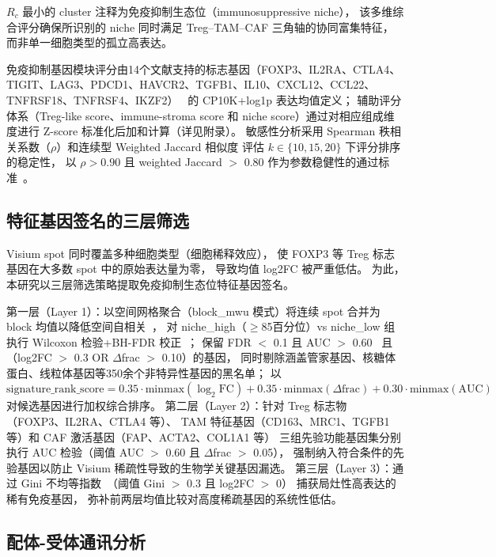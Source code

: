 \documentclass[12pt, a4paper]{ctexart}
\begin{document}
$R_c$ 最小的 cluster 注释为免疫抑制生态位（immunosuppressive niche），
该多维综合评分确保所识别的 niche 同时满足 Treg--TAM--CAF 三角轴的协同富集特征，
而非单一细胞类型的孤立高表达。

免疫抑制基因模块评分由14个文献支持的标志基因（FOXP3、IL2RA、CTLA4、TIGIT、LAG3、PDCD1、HAVCR2、TGFB1、IL10、CXCL12、CCL22、TNFRSF18、TNFRSF4、IKZF2）~\citep{sakaguchi2020regulatory,sharma2023immunosuppressive}
的 CP10K+log1p 表达均值定义；
辅助评分体系（Treg-like score、immune-stroma score 和 niche score）通过对相应组成维度进行 Z-score 标准化后加和计算（详见附录）。
敏感性分析采用 Spearman 秩相关系数（$\rho$）和连续型 Weighted Jaccard 相似度
评估 $k \in \{10, 15, 20\}$ 下评分排序的稳定性，
以 $\rho > 0.90$ 且 weighted Jaccard $>$ 0.80 作为参数稳健性的通过标准~\citep{spearman1904proof}。

\subsection{特征基因签名的三层筛选}

Visium spot 同时覆盖多种细胞类型（细胞稀释效应），
使 FOXP3 等 Treg 标志基因在大多数 spot 中的原始表达量为零，
导致均值 log2FC 被严重低估。
为此，本研究以三层筛选策略提取免疫抑制生态位特征基因签名。

第一层（Layer 1）：以空间网格聚合（block\_mwu 模式）将连续 spot 合并为 block 均值以降低空间自相关~\citep{palla2022squidpy}，
对 niche\_high（$\geq$85百分位）vs niche\_low 组执行 Wilcoxon 检验+BH-FDR 校正~\citep{mann1947test}；
保留 FDR $<$ 0.1 且 AUC $>$ 0.60~\citep{hanley1982meaning}
且（log2FC $>$ 0.3 OR $\Delta$frac $>$ 0.10）的基因，
同时剔除涵盖管家基因、核糖体蛋白、线粒体基因等350余个非特异性基因的黑名单；
以 $\text{signature\_rank\_score} = 0.35 \cdot \text{minmax}(\log_2\text{FC}) + 0.35 \cdot \text{minmax}(\Delta\text{frac}) + 0.30 \cdot \text{minmax}(\text{AUC})$
对候选基因进行加权综合排序。
第二层（Layer 2）：针对 Treg 标志物（FOXP3、IL2RA、CTLA4 等）、
TAM 特征基因（CD163、MRC1、TGFB1 等）和 CAF 激活基因（FAP、ACTA2、COL1A1 等）
三组先验功能基因集分别执行 AUC 检验（阈值 AUC $>$ 0.60 且 $\Delta$frac $>$ 0.05），
强制纳入符合条件的先验基因以防止 Visium 稀疏性导致的生物学关键基因漏选。
第三层（Layer 3）：通过 Gini 不均等指数~\citep{yitzhaki1979relative}（阈值 Gini $>$ 0.3 且 log2FC $>$ 0）
捕获局灶性高表达的稀有免疫基因，
弥补前两层均值比较对高度稀疏基因的系统性低估。

\subsection{配体-受体通讯分析}
\end{document}
